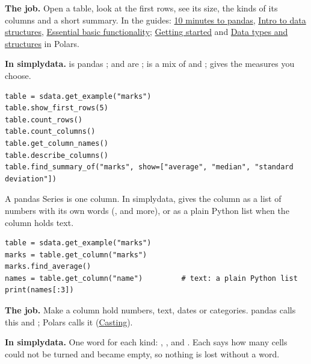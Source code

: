 
\textbf{The job.} Open a table, look at the first rows, see its size, the kinds of its columns and a
short summary. In the guides: \href{https://pandas.pydata.org/docs/user_guide/10min.html}{10 minutes
to pandas}, \href{https://pandas.pydata.org/docs/user_guide/dsintro.html}{Intro to data structures},
\href{https://pandas.pydata.org/docs/user_guide/basics.html}{Essential basic functionality};
\href{https://docs.pola.rs/user-guide/getting-started/}{Getting started} and
\href{https://docs.pola.rs/user-guide/concepts/data-types-and-structures/}{Data types and structures}
in Polars.

\textbf{In simplydata.}  is pandas ;  and
 are ;  is a mix of  and
;  gives the measures you choose.

\begin{lstlisting}[style=py]
table = sdata.get_example("marks")
table.show_first_rows(5)
table.count_rows()
table.count_columns()
table.get_column_names()
table.describe_columns()
table.find_summary_of("marks", show=["average", "median", "standard deviation"])
\end{lstlisting}

A pandas Series is one column. In simplydata,  gives the column as a
list of numbers with its own words (,  and more), or as a
plain Python list when the column holds text.

\begin{lstlisting}[style=py]
table = sdata.get_example("marks")
marks = table.get_column("marks")
marks.find_average()
names = table.get_column("name")         # text: a plain Python list
print(names[:3])
\end{lstlisting}


\textbf{The job.} Make a column hold numbers, text, dates or categories. pandas calls this
 and ; Polars calls it 
(\href{https://docs.pola.rs/user-guide/expressions/casting/}{Casting}).

\textbf{In simplydata.} One word for each kind: ,
,  and . Each says how
many cells could not be turned and became empty, so nothing is lost without a word.

